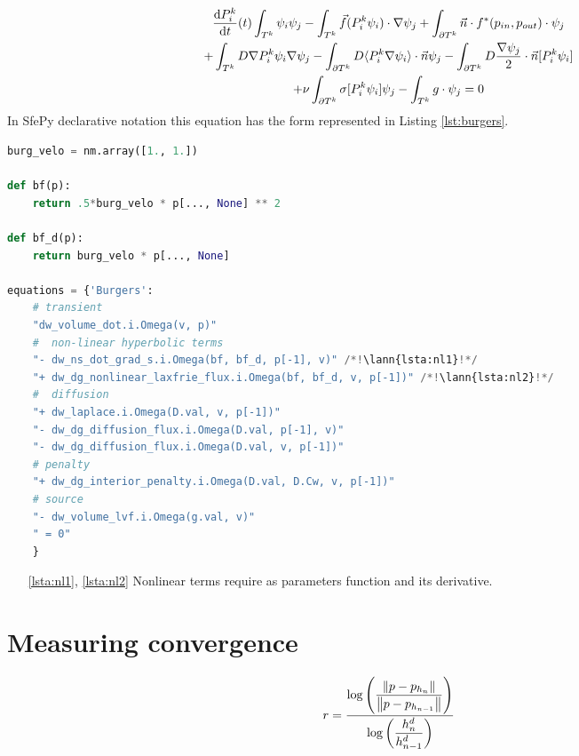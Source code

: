 \begin{multline}
	\frac{\text{d}P^k_i}{\text{d}t}(t)\int_{T^k}\psi_i\psi_j 
	- \int_{T^k} \vec{f}(P_i^k\psi_i)\cdot\nabla\psi_j 
	+ \int_{\partial{T^k}} \vec{n} \cdot f^{*} (p_{in}, p_{out})\cdot\psi_j\\
	+ \int_{T^k} D\nabla P^k_i\psi_i \nabla \psi_j
	- \int_{\partial T^k} D \langle P^k_i\nabla\psi_i\rangle \cdot \vec{n}\psi_j
	- \int_{\partial T^k} D \frac{\nabla \psi_j}{2}\cdot \vec{n} [P^k_i\psi_i] \\
	+ \nu \int_{\partial T^k} \sigma [P^k_i\psi_i]\psi_j
	- \int_{T^k} g\cdot \psi_j
	= 0
\end{multline}
In SfePy declarative notation this equation has the form represented in 
Listing \ref{lst:burgers}.
\setcounter{lstannotation}{0}
\begin{lstlisting}[language=Python, caption=Viscous Burgers equation \label{lst:burgers}]
burg_velo = nm.array([1., 1.])

def bf(p):
	return .5*burg_velo * p[..., None] ** 2

def bf_d(p):
	return burg_velo * p[..., None]

equations = {'Burgers':
	# transient
	"dw_volume_dot.i.Omega(v, p)"
	#  non-linear hyperbolic terms
	"- dw_ns_dot_grad_s.i.Omega(bf, bf_d, p[-1], v)" /*!\lann{lsta:nl1}!*/
	"+ dw_dg_nonlinear_laxfrie_flux.i.Omega(bf, bf_d, v, p[-1])" /*!\lann{lsta:nl2}!*/
	#  diffusion
	"+ dw_laplace.i.Omega(D.val, v, p[-1])"
	"- dw_dg_diffusion_flux.i.Omega(D.val, p[-1], v)"
	"- dw_dg_diffusion_flux.i.Omega(D.val, v, p[-1])"
	# penalty
	"+ dw_dg_interior_penalty.i.Omega(D.val, D.Cw, v, p[-1])"
	# source
	"- dw_volume_lvf.i.Omega(g.val, v)"
	" = 0"
	}
\end{lstlisting}
\begin{itemize}
	\item[\ref{lsta:nl1}, \ref{lsta:nl2}] Nonlinear terms require as parameters function 
	and its 
	derivative.
\end{itemize}


\section{Measuring convergence}
\begin{equation}
	r = \frac{\log\left(\dfrac{\left\lVert p - p_{h_{n}}\right\rVert}{\left\lVert p - p_{h_{n-1}}\right\rVert}\right)}
	{\log\left(\dfrac{h^d_{n}}{h^d_{n-1}}\right)}
\end{equation}

